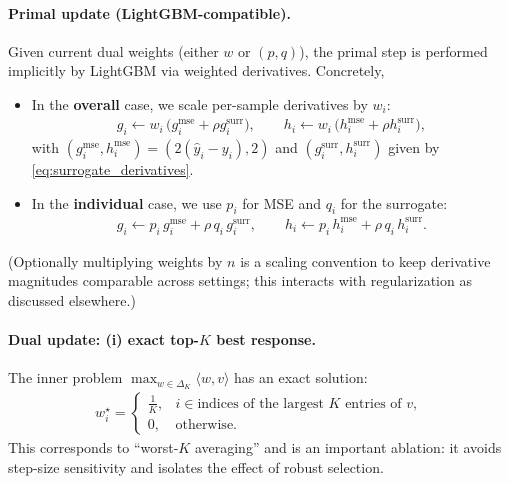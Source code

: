 \documentclass[11pt]{article}
\theoremstyle{plain}
\theoremstyle{definition}
\newcommand{\1}{\mathbf{1}}
\begin{document}
\paragraph{Primal update (LightGBM-compatible).}
Given current dual weights (either $w$ or $(p,q)$), the primal step is performed implicitly by LightGBM via weighted derivatives. Concretely,
\begin{itemize}
\item In the \textbf{overall} case, we scale per-sample derivatives by $w_i$:
\begin{align}
 g_i \leftarrow w_i\,\big(g_i^{\text{mse}} + \rho g_i^{\text{surr}}\big),\qquad
 h_i \leftarrow w_i\,\big(h_i^{\text{mse}} + \rho h_i^{\text{surr}}\big),
\end{align}
with $(g_i^{\text{mse}},h_i^{\text{mse}})=(2(\hat y_i-y_i),2)$ and $(g_i^{\text{surr}},h_i^{\text{surr}})$ given by \eqref{eq:surrogate_derivatives}.
\item In the \textbf{individual} case, we use $p_i$ for MSE and $q_i$ for the surrogate:
\begin{align}
 g_i \leftarrow p_i\,g_i^{\text{mse}} + \rho\,q_i\,g_i^{\text{surr}},\qquad
 h_i \leftarrow p_i\,h_i^{\text{mse}} + \rho\,q_i\,h_i^{\text{surr}}.
\end{align}
\end{itemize}
(Optionally multiplying weights by $n$ is a scaling convention to keep derivative magnitudes comparable across settings; this interacts with regularization as discussed elsewhere.)

\paragraph{Dual update: (i) exact top-$K$ best response.}
The inner problem $\max_{w\in\Delta_K}\langle w, v\rangle$ has an exact solution:
\begin{align}
 w_i^\star = \begin{cases}
\tfrac{1}{K}, & i\in\text{indices of the largest $K$ entries of }v,\\
0, & \text{otherwise.}
\end{cases}
\label{eq:topk_solution}
\end{align}
This corresponds to ``worst-$K$ averaging'' and is an important ablation: it avoids step-size sensitivity and isolates the effect of robust selection.
\end{document}
